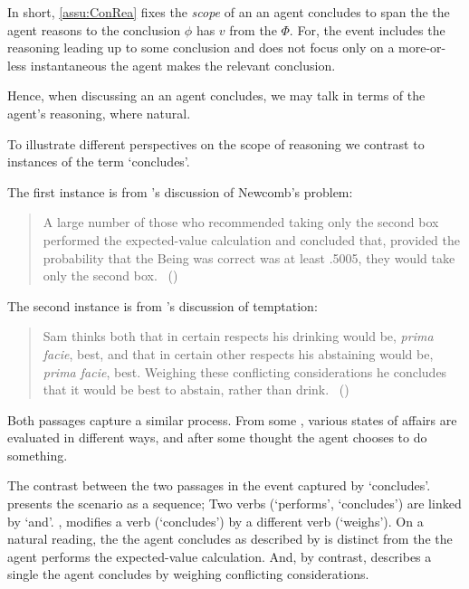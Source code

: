 \begin{note}
  In short, \autoref{assu:ConRea} fixes the \emph{scope} of an  an agent concludes to span the  the agent reasons to the conclusion \(\phi\) has  \(v\) from the \pool{} \(\Phi\).
  For, the event includes the reasoning leading up to some conclusion and does not focus only on a more-or-less instantaneous  the agent makes the relevant conclusion.

    Hence, when discussing an  an agent concludes, we may talk in terms of the agent's reasoning, where natural.
\end{note}


\begin{note}
  To illustrate different perspectives on the scope of reasoning we contrast to instances of the term `concludes'.

  The first instance is from \citeauthor{Gardner:1986wp}'s discussion of Newcomb's problem:
  \begin{quote}
    A large number of those who recommended taking only the second box performed the expected-value calculation and concluded that, provided the probability that the Being was correct was at least .5005, they would take only the second box.%
    \mbox{ }\hfill\mbox{(\citeyear[166]{Gardner:1986wp})}
  \end{quote}
  The second instance is from \citeauthor{Bratman:1979aa}'s discussion of temptation:
  \begin{quote}
    Sam thinks both that in certain respects his drinking would be, \emph{prima facie}, best, and that in certain other respects his abstaining would be, \emph{prima facie}, best.
    Weighing these conflicting considerations he concludes that it would be best to abstain, rather than drink.%
    \mbox{ }\hfill\mbox{(\citeyear[156]{Bratman:1979aa})}
  \end{quote}
  Both passages capture a similar process.
  From some \agpe{}, various states of affairs are evaluated in different ways, and after some thought the agent chooses to do something.

  The contrast between the two passages in the event captured by `concludes'.
  \citeauthor{Gardner:1986wp} presents the scenario as a sequence;
  Two verbs (`performs', `concludes') are linked by `and'.
  \citeauthor{Bratman:1979aa}, modifies a verb (`concludes') by a different verb (`weighs').
  On a natural reading, the  the agent concludes as described by \citeauthor{Gardner:1986wp} is distinct from the  the agent performs the expected-value calculation.
  And, by contrast, \citeauthor{Bratman:1979aa} describes a single  the agent concludes by weighing conflicting considerations.


\end{note}

